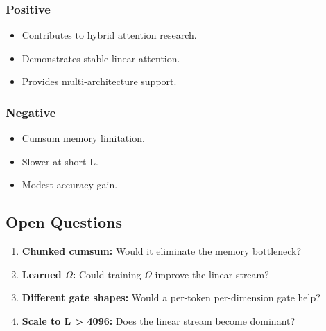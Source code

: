 \subsubsection{Positive}
\begin{itemize}
\item Contributes to hybrid attention research.
\item Demonstrates stable linear attention.
\item Provides multi-architecture support.

\end{itemize}
\subsubsection{Negative}
\begin{itemize}
\item Cumsum memory limitation.
\item Slower at short L.
\item Modest accuracy gain.

\end{itemize}
\subsection{Open Questions}

\begin{enumerate}
\item \textbf{Chunked cumsum:} Would it eliminate the memory bottleneck?
\item \textbf{Learned $\Omega$:} Could training $\Omega$ improve the linear stream?
\item \textbf{Different gate shapes:} Would a per-token per-dimension gate help?
\item \textbf{Scale to L \textgreater{} 4096:} Does the linear stream become dominant?

\end{enumerate}
